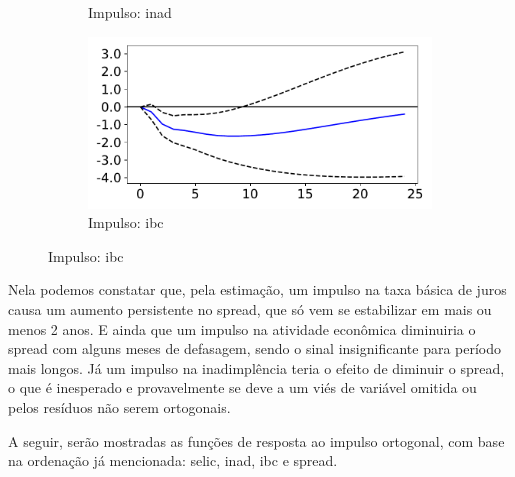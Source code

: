 \documentclass[a4paper,
               article,
               12pt,
               openany,
               oneside,
               english,
               brazil]{abntex2}
\numberwithin{equation}{section}
\begin{document}
\begin{figure}[h!bt]
\begin{subfigure}[t]{.5\linewidth}
            \caption{Impulso: inad}
        \end{subfigure}
        \begin{subfigure}[t]{.5\linewidth}
            \includegraphics[width = \textwidth, scale=1]{irf/spread_ibc.pdf}
            \caption{Impulso: ibc}
        \end{subfigure}
        \label{irf_spread}
    \end{figure}

    Nela podemos constatar que, pela estimação, um impulso na taxa básica de juros causa um aumento persistente no spread, que só vem se estabilizar em mais ou menos 2 anos. E ainda que um impulso na atividade econômica diminuiria o spread com alguns meses de defasagem, sendo o sinal insignificante para período mais longos. Já um impulso na inadimplência teria o efeito de diminuir o spread, o que é inesperado e provavelmente se deve a um viés de variável omitida ou pelos resíduos não serem ortogonais.

    A seguir, serão mostradas as funções de resposta ao impulso ortogonal, com base na ordenação já mencionada: selic, inad, ibc e spread.
\end{document}
